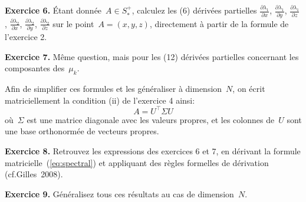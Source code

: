 \documentclass[a4paper,11pt]{article}
\begin{document}
{\bf Exercice 6.}
Étant donnée~$A\in S^+_*$, calculez les (6) dérivées partielles
$\frac{\partial\lambda_1}{\partial x}$,
$\frac{\partial\lambda_1}{\partial y}$,
$\frac{\partial\lambda_1}{\partial z}$,
$\frac{\partial\lambda_2}{\partial x}$,
$\frac{\partial\lambda_2}{\partial y}$,
$\frac{\partial\lambda_2}{\partial z}$
sur le point~$A=(x,y,z)$, directement à partir de la formule de l'exercice 2.

{\bf Exercice 7.}
Même question, mais pour les (12) dérivées partielles concernant les
composantes des~$\mu_k$.

\vfill

Afin de simplifier ces formules et les généraliser à dimension~$N$,
on écrit matriciellement la condition (ii) de l'exercice 4 ainsi:
\begin{equation}\label{eq:spectral}
	A = U^\top \Sigma U
\end{equation}
où~$\Sigma$ est une matrice diagonale avec les valeurs propres, et les colonnes
de~$U$ sont une base orthonormée de vecteurs propres.

{\bf Exercice 8.}
Retrouvez les expressions des exercices 6 et 7, en dérivant la formule
matricielle~(\ref{eq:spectral}) et appliquant des règles formelles de
dérivation (cf.Gilles~2008).

{\bf Exercice 9.}
Généralisez tous ces résultats au cas de dimension~$N$.
\end{document}
